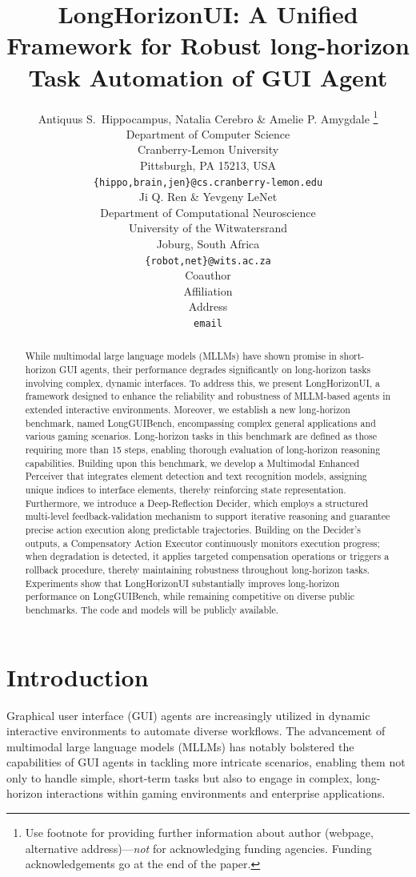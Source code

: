 \documentclass{article} %
\title{LongHorizonUI: A Unified Framework for Robust long-horizon Task Automation of GUI Agent}
\author{Antiquus S.~Hippocampus, Natalia Cerebro \& Amelie P. Amygdale \thanks{ Use footnote for providing further information
about author (webpage, alternative address)---\emph{not} for acknowledging
funding agencies.  Funding acknowledgements go at the end of the paper.} \\
Department of Computer Science\\
Cranberry-Lemon University\\
Pittsburgh, PA 15213, USA \\
\texttt{\{hippo,brain,jen\}@cs.cranberry-lemon.edu} \\
\And
Ji Q. Ren \& Yevgeny LeNet \\
Department of Computational Neuroscience \\
University of the Witwatersrand \\
Joburg, South Africa \\
\texttt{\{robot,net\}@wits.ac.za} \\
\AND
Coauthor \\
Affiliation \\
Address \\
\texttt{email}
}
\begin{document}
\maketitle

\begin{abstract}

While multimodal large language models (MLLMs) have shown promise in short-horizon GUI agents, their performance degrades significantly on long-horizon tasks involving complex, dynamic interfaces. To address this, we present LongHorizonUI, a framework designed to enhance the reliability and robustness of MLLM-based agents in extended interactive environments.
Moreover, we establish a new long-horizon benchmark, named LongGUIBench, encompassing complex general applications and various gaming scenarios. Long-horizon tasks in this benchmark are defined as those requiring more than 15 steps, enabling thorough evaluation of long-horizon reasoning capabilities. Building upon this benchmark, we develop a Multimodal Enhanced Perceiver that integrates element detection and text recognition models, assigning unique indices to interface elements, thereby reinforcing state representation.
Furthermore, we introduce a Deep-Reflection Decider, which employs a structured multi-level feedback-validation mechanism to support iterative reasoning and guarantee precise action execution along predictable trajectories. Building on the Decider’s outputs, a Compensatory Action Executor continuously monitors execution progress; when degradation is detected, it applies targeted compensation operations or triggers a rollback procedure, thereby maintaining robustness throughout long-horizon tasks. Experiments show that LongHorizonUI substantially improves long-horizon performance on LongGUIBench, while remaining competitive on diverse public benchmarks. The code and models will be publicly available.


\end{abstract}

\section{Introduction}
\label{sec:intro}


Graphical user interface (GUI) agents \citep{Hong_2024_CVPR_CogAgent, Wang_2025_Guiagents_Survey, Huang_2025_CVPR, Wang_2025_MobileA3gent, cradle} are increasingly utilized in dynamic interactive environments to automate diverse workflows. The advancement of multimodal large language models (MLLMs) \citep{Liu_2023_NeurIPS_LLaVA, Li_2023_ICML_BLIP2, Lin_2024_CVPR_MoELLaVA, MLLM_Survey_TPAMI} has notably bolstered the capabilities of GUI agents in tackling more intricate scenarios, enabling them not only to handle simple, short-term tasks \citep{Hong_2024_CVPR_CogAgent, Sun_2025_Osgenesis} but also to engage in complex, long-horizon interactions within gaming environments and enterprise applications.
\end{document}

